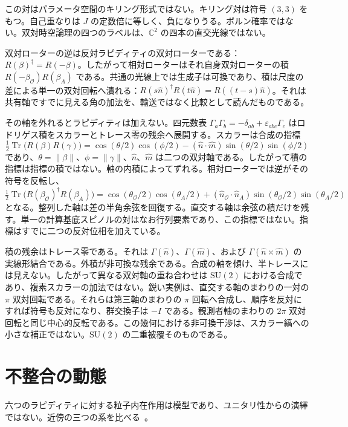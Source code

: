 \documentclass[a4paper]{article}
\begin{document}
この対はパラメータ空間のキリング形式ではない。キリング対は符号 \((3,3)\) をもつ。自己重なりは \(J\) の定数倍に等しく、負になりうる。ボルン確率ではない。双対時空論理の四つのラベルは、\(\mathbb{C}^2\) の四本の直交光線ではない。

双対ローターの逆は反対ラピディティの双対ローターである：\(R(\beta)^{\dagger}=R(-\beta)\)。したがって相対ローターはそれ自身双対ローターの積 \(R(-\beta_{\mathcal{O}})R(\beta_A)\) である。共通の光線上では生成子は可換であり、積は尺度の差による単一の双対回転へ潰れる：\(R(s\hat n)^{\dagger}R(t\hat n)=R((t-s)\hat n)\)。それは共有軸ですでに見える角の加法を、輸送ではなく比較として読んだものである。

その軸を外れるとラピディティは加えない。四元数表 \(\Gamma_a\Gamma_b=-\delta_{ab}+\varepsilon_{abc}\Gamma_c\) はロドリゲス積をスカラーとトレース零の残余へ展開する。スカラーは合成の指標
\[
\tfrac12\operatorname{Tr}\bigl(R(\beta)R(\gamma)\bigr)
  =\cos(\theta/2)\cos(\phi/2)-(\hat n\cdot\hat m)\sin(\theta/2)\sin(\phi/2)
\]
であり、\(\theta=\lVert\beta\rVert\)、\(\phi=\lVert\gamma\rVert\)、\(\hat n\)、\(\hat m\) は二つの双対軸である。したがって積の指標は指標の積ではない。軸の内積によってずれる。相対ローターでは逆がその符号を反転し、
\[
\tfrac12\operatorname{Tr}\bigl(R(\beta_{\mathcal{O}})^{\dagger}R(\beta_A)\bigr)
  =\cos(\theta_{\mathcal{O}}/2)\cos(\theta_A/2)+(\hat n_{\mathcal{O}}\cdot\hat n_A)\sin(\theta_{\mathcal{O}}/2)\sin(\theta_A/2)
\]
となる。整列した軸は差の半角余弦を回復する。直交する軸は余弦の積だけを残す。単一の計算基底スピノルの対はなお行列要素であり、この指標ではない。指標はすでに二つの反対位相を加えている。

積の残余はトレース零である。それは \(\Gamma(\hat n)\)、\(\Gamma(\hat m)\)、および \(\Gamma(\hat n\times\hat m)\) の実線形結合である。外積が非可換な残余である。合成の軸を傾け、半トレースには見えない。したがって異なる双対軸の重ね合わせは \(\mathrm{SU}(2)\) における合成であり、複素スカラーの加法ではない。鋭い実例は、直交する軸のまわりの一対の \(\pi\) 双対回転である。それらは第三軸のまわりの \(\pi\) 回転へ合成し、順序を反対にすれば符号も反対になり、群交換子は \(-I\) である。観測者軸のまわりの \(2\pi\) 双対回転と同じ中心的反転である。この幾何における非可換干渉は、スカラー縞への小さな補正ではない。\(\mathrm{SU}(2)\) の二重被覆そのものである。

\section{不整合の動態}

六つのラピディティに対する粒子内在作用は模型であり、ユニタリ性からの演繹ではない。近傍の三つの系を比べる~\cite{dst-dynamic-equation,dst-main}。
\end{document}
